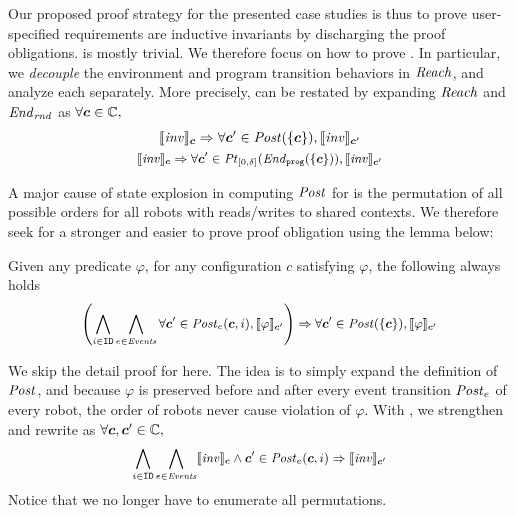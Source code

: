 Our proposed proof strategy for the presented case studies is thus to prove
user-specified requirements are inductive invariants by discharging the proof obligations.
 is mostly trivial.
We therefore focus on how to prove .
In particular, we \emph{decouple} the environment and program transition behaviors in $\mathit{Reach}$,
and analyze each separately.
More precisely,  can be restated by expanding $\mathit{Reach}$ and $\mathit{End}_\mathit{rnd}$ as $\forall \mathit{\boldsymbol{c}} \in \mathbb{C},$
\begin{gather}
\llbracket\mathit{inv}\rrbracket_{\mathit{\boldsymbol{c}}} \Rightarrow \forall \mathit{\boldsymbol{c}}' \in \mathit{Post}(\left\{\mathit{\boldsymbol{c}}\right\}), \llbracket\mathit{inv}\rrbracket_{\mathit{\boldsymbol{c}}'}\label{po:ind-hyp-prog}\\
\small
\llbracket\mathit{inv}\rrbracket_{\mathit{\boldsymbol{c}}} \Rightarrow \forall \mathit{\boldsymbol{c}}' \in \mathit{Pt}_{[0,\delta]}(\mathit{End}_{\mathtt{prog}}(\left\{\mathit{\boldsymbol{c}}\right\})), \llbracket\mathit{inv}\rrbracket_{\mathit{\boldsymbol{c}}'}\label{po:ind-hyp-env}
\end{gather}

A major cause of state explosion in computing $\mathit{Post}$ for 
is the permutation of all possible orders for all robots
with reads/writes to shared contexts.
We therefore seek for a stronger and easier to prove proof obligation using the lemma below:
\begin{lemma}
   \label{lem:noninter}
Given any predicate $\varphi$,
for any configuration $c$ satisfying $\varphi$, the following always holds
\[
\small
\left(\bigwedge_{i\in \texttt{ID}}\bigwedge_{e \in \mathit{Events}} \forall \mathit{\boldsymbol{c}}' \in \mathit{Post}_e(\mathit{\boldsymbol{c}}, i), \llbracket\varphi\rrbracket_{\mathit{\boldsymbol{c}}'}\right)
    \Rightarrow \forall \mathit{\boldsymbol{c}}' \in \mathit{Post}(\left\{\mathit{\boldsymbol{c}}\right\}), \llbracket\varphi\rrbracket_{\mathit{\boldsymbol{c}}'}
\]
\end{lemma}
We skip the detail proof for  here.
The idea is to simply expand the definition of $\mathit{Post}$,
and because $\varphi$ is preserved before and after every event transition $\mathit{Post}_e$ of every robot,
the order of robots never cause violation of $\varphi$.
With , we strengthen and rewrite  as $\forall \mathit{\boldsymbol{c}}, \mathit{\boldsymbol{c}}' \in \mathbb{C},$
\begin{equation}
\small
\bigwedge_{i\in \texttt{ID}}\bigwedge_{e \in \mathit{Events}} \llbracket\mathit{inv}\rrbracket_{\mathit{\boldsymbol{c}}} \land \mathit{\boldsymbol{c}}' \in \mathit{Post}_e(\mathit{\boldsymbol{c}}, i)
    \Rightarrow \llbracket\mathit{inv}\rrbracket_{\mathit{\boldsymbol{c}}'}\label{po:ind-hyp-event}
\end{equation}
Notice that we no longer have to enumerate all permutations.


